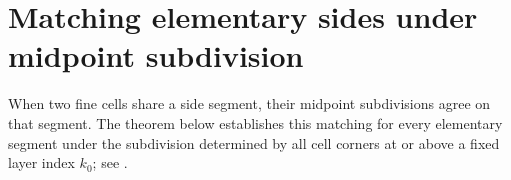 \section{Matching elementary sides under midpoint subdivision}
\label{sec:area_law_actual_side_matching}

When two fine cells share a side segment, their midpoint subdivisions
agree on that segment. The theorem below establishes this matching for
every elementary segment under the subdivision determined by all cell
corners at or above a fixed layer index $k_0$; see
\cite[Section~11]{OpenAI2026AreaLaw}.


